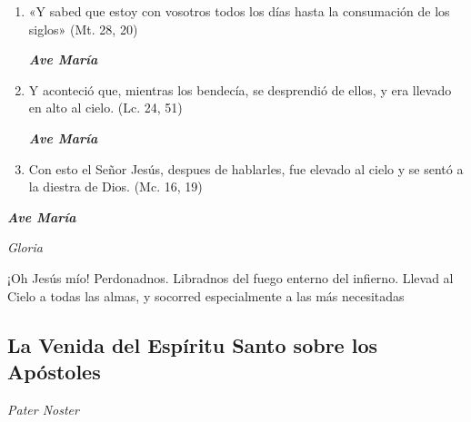 \documentclass[a4paper,11pt, oneside]{report}
\begin{document}
\begin{enumerate}
        \item «Y sabed que estoy con vosotros todos los días hasta la consumación de los siglos» (Mt. 28, 20)

        \textbf{\textit{Ave María}}

        \item Y aconteció que, mientras los bendecía, se desprendió de ellos, y era llevado en alto al cielo. (Lc. 24, 51)

        \textbf{\textit{Ave María}}

        \item Con esto el Señor Jesús, despues de hablarles, fue elevado al cielo y se sentó a la diestra de Dios. (Mc. 16, 19)

      \end{enumerate}

      \textbf{\textit{Ave María}} \par
      \indent\textit{Gloria} \par
      \indent¡Oh Jesús mío! Perdonadnos. Libradnos del fuego enterno del infierno. Llevad al Cielo a todas las almas, y socorred especialmente a las más 
      necesitadas

    \subsection*{ La Venida del Espíritu Santo sobre los Apóstoles }

      \textit{Pater Noster}
\end{document}
